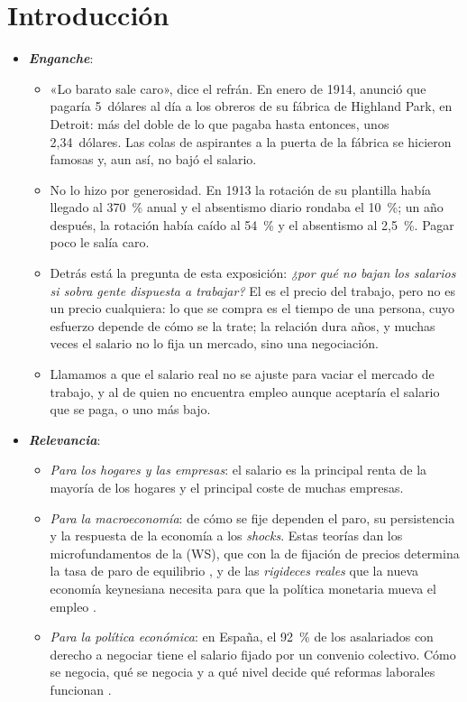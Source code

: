 \documentclass[11pt]{article}
\begin{document}
\tceetitulo

\section*{Introducción}

\begin{itemize}
\item \textbf{\emph{Enganche}}:
  \begin{itemize}
  \item «Lo barato sale caro», dice el refrán. En enero de 1914,  anunció que pagaría 5~dólares al día a los obreros de su fábrica de Highland Park, en Detroit: más del doble de lo que pagaba hasta entonces, unos 2,34~dólares\nocite{RaffSummers1986Ford}. Las colas de aspirantes a la puerta de la fábrica se hicieron famosas y, aun así, no bajó el salario.
  \item No lo hizo por generosidad. En 1913 la rotación de su plantilla había llegado al 370~\% anual y el absentismo diario rondaba el 10~\%; un año después, la rotación había caído al 54~\% y el absentismo al 2,5~\%\nocite{RaffSummers1986Ford}. Pagar poco le salía caro.
  \item Detrás está la pregunta de esta exposición: \emph{¿por qué no bajan los salarios si sobra gente dispuesta a trabajar?} El  es el precio del trabajo, pero no es un precio cualquiera: lo que se compra es el tiempo de una persona, cuyo esfuerzo depende de cómo se la trate; la relación dura años, y muchas veces el salario no lo fija un mercado, sino una negociación.
  \item Llamamos  a que el salario real no se ajuste para vaciar el mercado de trabajo, y  al de quien no encuentra empleo aunque aceptaría el salario que se paga, o uno más bajo.
  \end{itemize}

\item \textbf{\emph{Relevancia}}:
  \begin{itemize}
  \item \emph{Para los hogares y las empresas}: el salario es la principal renta de la mayoría de los hogares y el principal coste de muchas empresas.
  \item \emph{Para la macroeconomía}: de cómo se fije dependen el paro, su persistencia y la respuesta de la economía a los \emph{shocks}. Estas teorías dan los microfundamentos de la  (WS), que con la de fijación de precios determina la tasa de paro de equilibrio , y de las \emph{rigideces reales} que la nueva economía keynesiana necesita para que la política monetaria mueva el empleo .
  \item \emph{Para la política económica}: en España, el 92~\% de los asalariados con derecho a negociar tiene el salario fijado por un convenio colectivo\nocite{OCDE2026ICTWSSCobertura}. Cómo se negocia, qué se negocia y a qué nivel decide qué reformas laborales funcionan .
  \end{itemize}


\end{itemize}
\end{document}
